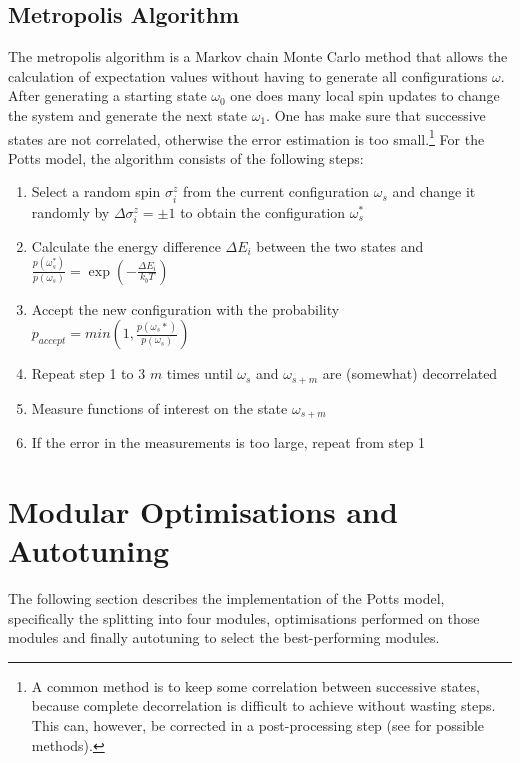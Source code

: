 \documentclass[letterpaper]{article}
\begin{document}
\subsection{Metropolis Algorithm}
The metropolis algorithm is a Markov chain Monte Carlo method \cite{MC} that
allows the calculation of expectation values without having to generate
all configurations $\omega$. After generating a starting state $\omega_{0}$
one does many local spin updates to change the system and generate
the next state $\omega_{1}$. One has make sure that successive states are
not correlated, otherwise the error estimation is too small.\footnote{A common method is to keep some correlation between successive states, because complete decorrelation is difficult to achieve without wasting steps. This can, however, be corrected in a post-processing step (see \cite{Jackknife} for possible methods).} For
the Potts model, the algorithm consists of the following steps:
\begin{enumerate}[noitemsep, topsep = 0pt]
\item Select a random spin $\sigma_{i}^{z}$ from the current configuration
$\omega_{s}$ and change it randomly by $\Delta\sigma_{i}^{z}=\pm1$
to obtain the configuration $\omega_{s}^{*}$
\item Calculate the energy difference $\Delta E_{i}$ between the two states and  $\frac{p(\omega_{s}^{*})}{p(\omega_{s})}=\exp{\left(-\frac{\Delta E_{i}}{k_{b}T}\right)}$
\item Accept the new configuration with the probability
\\ $p_{accept}=min(1,\frac{p(\omega_{s}*)}{p(\omega_{s})})$
\item Repeat step 1 to 3 $m$ times until $\omega_{s}$ and $\omega_{s+m}$
are (somewhat) decorrelated
\item Measure functions of interest on the state $\omega_{s+m}$
\item If the error in the measurements is too large, repeat from step 1\end{enumerate}
\section{Modular Optimisations and Autotuning}\label{sec:yourmethod}
The following section describes the implementation of the Potts model, specifically the splitting into four modules, optimisations performed on those modules and finally autotuning to select the best-performing modules.
\end{document}
